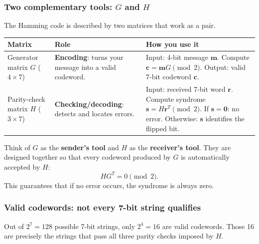 \documentclass[11pt, a4paper]{article}
\theoremstyle{definition}
\theoremstyle{plain}
\theoremstyle{remark}
\begin{document}
\subsubsection{Two complementary tools: $G$ and $H$}

The Hamming code is described by two matrices that work as a pair.

\begin{center}
\renewcommand{\arraystretch}{1.6}
\begin{tabular}{@{} l p{3.8cm} p{6cm} @{}}
  \toprule
  \textbf{Matrix} & \textbf{Role} & \textbf{How you use it}\\
  \midrule
  Generator matrix $G$ \newline ($4\times7$)
    & \textbf{Encoding}: turns your message into a valid codeword.
    & Input: 4-bit message $\mathbf{m}$.
      Compute $\mathbf{c} = \mathbf{m}G \pmod{2}$.
      Output: valid 7-bit codeword $\mathbf{c}$.\\[4pt]
  Parity-check matrix $H$ \newline ($3\times7$)
    & \textbf{Checking/decoding}: detects and locates errors.
    & Input: received 7-bit word $\mathbf{r}$.
      Compute syndrome $\mathbf{s} = H\mathbf{r}^T \pmod{2}$.
      If $\mathbf{s}=\mathbf{0}$: no error.
      Otherwise: $\mathbf{s}$ identifies the flipped bit.\\
  \bottomrule
\end{tabular}
\end{center}

\medskip\noindent
Think of $G$ as the \textbf{sender's tool} and $H$ as the
\textbf{receiver's tool}.  They are designed together so that every
codeword produced by $G$ is automatically accepted by $H$:
\[
  H G^T = 0 \pmod{2}.
\]
This guarantees that if no error occurs, the syndrome is always zero.

\subsubsection{Valid codewords: not every 7-bit string qualifies}

Out of $2^7 = 128$ possible 7-bit strings, only $2^4 = 16$ are valid
codewords.  Those 16 are precisely the strings that pass all three
parity checks imposed by $H$.
\end{document}
